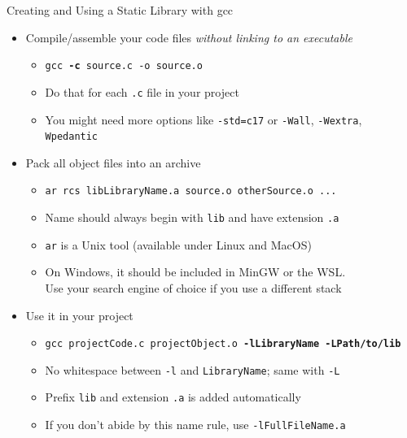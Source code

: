 \begin{frame}{Creating and Using a Static Library with gcc}
%
\begin{itemize}
\item Compile/assemble your code files \emph{without linking to an executable}
	\begin{itemize}
	\item \texttt{gcc \textbf{-c} source.c -o source.o}
	\item Do that for each \texttt{.c} file in your project
	\item You might need more options like \texttt{-std=c17} or \texttt{-Wall}, \texttt{-Wextra}, \texttt{Wpedantic}
	\end{itemize}
\item Pack all object files into an archive
	\begin{itemize}
	\item \texttt{ar rcs libLibraryName.a source.o otherSource.o ...}
	\item Name should always begin with \texttt{lib} and have extension \texttt{.a}
	\item \texttt{ar} is a Unix tool (\thus available under Linux and MacOS)
	\item On Windows, it should be included in MinGW or the WSL.\\
		Use your search engine of choice if you use a different stack
	\end{itemize}
\item Use it in your project
	\begin{itemize}
	\item \texttt{gcc projectCode.c projectObject.o \textbf{-lLibraryName -LPath/to/lib}}
	\item No whitespace between \texttt{-l} and \texttt{LibraryName}; same with \texttt{-L}
	\item Prefix \texttt{lib} and extension \texttt{.a} is added automatically
	\item If you don't abide by this name rule, use \texttt{-lFullFileName.a}
	\end{itemize}
\end{itemize}
%
\end{frame}


